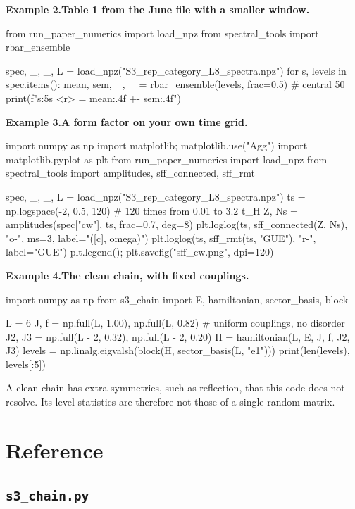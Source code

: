 \documentclass[11pt,a4paper]{article}
\newcommand{\example}[2]{\par\needspace{7\baselineskip}\medskip
  {\color{accent}\bfseries Example #1.}\enspace\textbf{#2}\par\nopagebreak}
\begin{document}
\example{2}{Table 1 from the June file with a smaller window.}
\begin{python}
from run_paper_numerics import load_npz
from spectral_tools import rbar_ensemble

spec, _, _, L = load_npz("S3_rep_category_L8_spectra.npz")
for s, levels in spec.items():
    mean, sem, _, _ = rbar_ensemble(levels, frac=0.5)                 # central 50%
    print(f"{s:5s} <r> = {mean:.4f} +- {sem:.4f}")
\end{python}

\example{3}{A form factor on your own time grid.}
\begin{python}
import numpy as np
import matplotlib; matplotlib.use("Agg")
import matplotlib.pyplot as plt
from run_paper_numerics import load_npz
from spectral_tools import amplitudes, sff_connected, sff_rmt

spec, _, _, L = load_npz("S3_rep_category_L8_spectra.npz")
ts = np.logspace(-2, 0.5, 120)                                        # 120 times from 0.01 to 3.2 t_H
Z, Ns = amplitudes(spec["cw"], ts, frac=0.7, deg=8)
plt.loglog(ts, sff_connected(Z, Ns), "o-", ms=3, label="([c], omega)")
plt.loglog(ts, sff_rmt(ts, "GUE"), "r-", label="GUE")
plt.legend(); plt.savefig("sff_cw.png", dpi=120)
\end{python}

\example{4}{The clean chain, with fixed couplings.}
\begin{python}
import numpy as np
from s3_chain import E, hamiltonian, sector_basis, block

L = 6
J, f = np.full(L, 1.00), np.full(L, 0.82)                             # uniform couplings, no disorder
J2, J3 = np.full(L - 2, 0.32), np.full(L - 2, 0.20)
H = hamiltonian(L, E, J, f, J2, J3)
levels = np.linalg.eigvalsh(block(H, sector_basis(L, "e1")))
print(len(levels), levels[:5])
\end{python}
A clean chain has extra symmetries, such as reflection, that this code does not resolve. Its level statistics
are therefore not those of a single random matrix.

\section{Reference}\label{sec:reference}

\subsection{\texttt{s3\_chain.py}}
\end{document}
